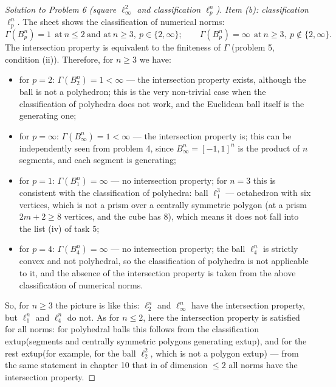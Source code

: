 \documentclass[a4paper,12pt]{report}
\begin{document}
\begin{proof}[Solution to Problem \textup{6} \textup{(}square $\ell_\infty^2$ and classification $\ell_p^n$\textup{)}]
\textit{Item \textup{(b)}\textup{:} classification $\ell_p^n$.} The sheet shows the classification of numerical norms\textup{:}
\[
\Gamma(B_p^n)=1\ \ \text{at}\ n\le2\ \text{and at}\ n\ge3,\ p\in\{2,\infty\};\qquad
\Gamma(B_p^n)=\infty\ \ \text{at}\ n\ge3,\ p\notin\{2,\infty\} .
\]
The intersection property is equivalent to the finiteness of $\Gamma$ \textup{(}problem \textup{5}, condition \textup{(ii)}\textup{)}. Therefore, for $n\ge3$ we have\textup{:}
\begin{itemize}
\item for $p=2$\textup{:} $\Gamma(B_2^n)=1<\infty$ --- the intersection property exists, although the ball is not a polyhedron\textup{;} this is the very non-trivial case when the classification of polyhedra does not work, and the Euclidean ball itself is the generating one;
\item for $p=\infty$\textup{:} $\Gamma(B_\infty^n)=1<\infty$ --- the intersection property is\textup{;} this can be independently seen from problem \textup{4}, since $B_\infty^n=[-1,1]^n$ is the product of $n$ segments, and each segment is generating;
\item for $p=1$\textup{:} $\Gamma(B_1^n)=\infty$ --- no intersection property\textup{;} for $n=3$ this is consistent with the classification of polyhedra\textup{:} ball $\ell_1^3$ --- octahedron with six vertices, which is not a prism over a centrally symmetric polygon \textup{(}at a prism $2m+2\ge8$ vertices, and the cube has $8$\textup{)}, which means it does not fall into the list \textup{(iv)} of task \textup{5};
\item for $p=4$\textup{:} $\Gamma(B_4^n)=\infty$ --- no intersection property\textup{;} the ball $\ell_4^n$ is strictly convex and not polyhedral, so the classification of polyhedra is not applicable to it, and the absence of the intersection property is taken from the above classification of numerical norms.
\end{itemize}
So, for $n\ge3$ the picture is like this\textup{:} $\ell_2^n$ and $\ell_\infty^n$ have the intersection property, but $\ell_1^n$ and $\ell_4^n$ do not. As for $n\le2$, here the intersection property is satisfied for all norms\textup{:} for polyhedral balls this follows from the classification extup{(}segments and centrally symmetric polygons generating extup{)}, and for the rest extup{(}for example, for the ball $\ell_2^2$, which is not a polygon extup{)} --- from the same statement in chapter \textup{10} that in of dimension $\le2$ all norms have the intersection property.

\end{proof}
\end{document}
